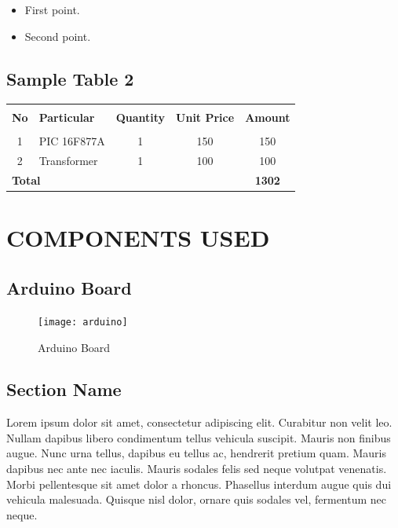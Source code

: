 \documentclass[12pt,a4paper]{report}
\begin{document}
\begin{itemize}
\item First point.
\item Second point.
\end{itemize}


\section{Sample Table 2}

\begin{table}[h]
\begin{center}
\begin{tabular}{|c|l|c|c|c|}
 \hline
   &                          &          &            &        \\ 
 \textbf{No} & \textbf{Particular} & \textbf{Quantity} & \textbf{Unit Price} & \textbf{Amount} \\ 
   &                          &          &            &        \\ \hline
1  & PIC 16F877A              & 1        & 150        & 150    \\ \hline
2  & Transformer              & 1        & 100        & 100    \\ \hline
\multicolumn{4}{|l}{\textbf{Total}}               \vline              & \textbf{1302} \\  \hline    
\end{tabular}
\end{center}
\end{table}


\chapter{COMPONENTS USED}

 \section{Arduino Board}

\begin{figure}[H]
	\begin{center}
		\leavevmode
			\texttt{[image: arduino]}
	\end{center}
		\caption{Arduino Board}
		\label{fig:Arduino Board}
\end{figure}

\section{Section Name}
Lorem ipsum dolor sit amet, consectetur adipiscing elit. Curabitur non velit leo. Nullam dapibus libero condimentum tellus vehicula suscipit. Mauris non finibus augue. Nunc urna tellus, dapibus eu tellus ac, hendrerit pretium quam. Mauris dapibus nec ante nec iaculis. Mauris sodales felis sed neque volutpat venenatis. Morbi pellentesque sit amet dolor a rhoncus. Phasellus interdum augue quis dui vehicula malesuada. Quisque nisl dolor, ornare quis sodales vel, fermentum nec neque. 
\end{document}
